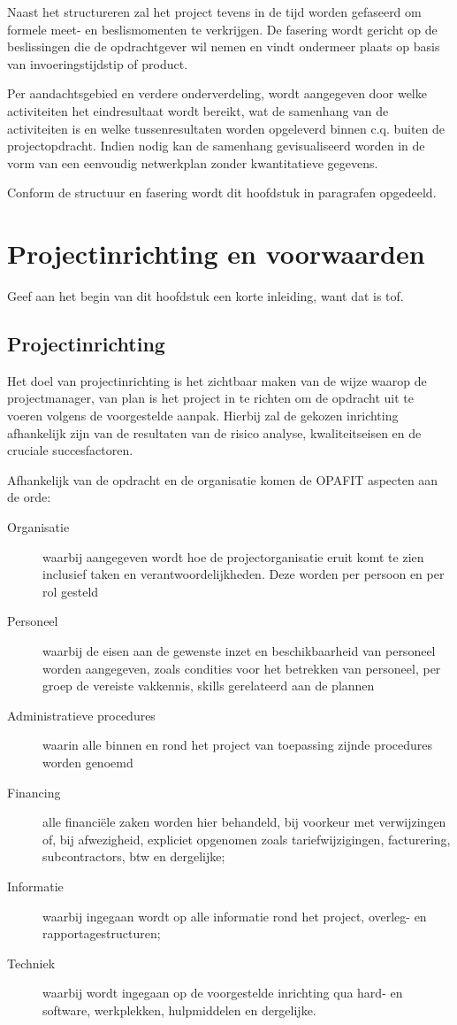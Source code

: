 \documentclass{article}
\begin{document}
Naast het structureren zal het project tevens in de tijd worden gefaseerd om formele meet- en beslismomenten te verkrijgen.
De fasering wordt gericht op de beslissingen die de opdrachtgever wil nemen
en vindt ondermeer plaats op basis van invoeringstijdstip of product.

Per aandachtsgebied en verdere onderverdeling, wordt aangegeven door welke activiteiten het eindresultaat wordt bereikt,
wat de samenhang van de activiteiten is en welke tussenresultaten worden opgeleverd binnen c.q. buiten de projectopdracht.
Indien nodig kan de samenhang gevisualiseerd worden in de vorm van een eenvoudig netwerkplan zonder kwantitatieve gegevens.

Conform de structuur en fasering wordt dit hoofdstuk in paragrafen opgedeeld.

\section{Projectinrichting en voorwaarden}

Geef aan het begin van dit hoofdstuk een korte inleiding, want dat is tof. %

\subsection{Projectinrichting}

Het doel van projectinrichting is het zichtbaar maken van de wijze waarop de projectmanager,
van plan is het project in te richten om de opdracht uit te voeren volgens de voorgestelde aanpak.
Hierbij zal de gekozen inrichting afhankelijk zijn van de resultaten van de risico analyse,
kwaliteitseisen en de cruciale succesfactoren.

Afhankelijk van de opdracht en de organisatie komen de OPAFIT aspecten aan de orde:
\begin{description}
  \item[Organisatie] waarbij aangegeven wordt hoe de projectorganisatie eruit komt te zien inclusief taken en verantwoordelijkheden.
  Deze worden per persoon en per rol gesteld
  \item[Personeel] waarbij de eisen aan de gewenste inzet en beschikbaarheid van personeel worden aangegeven,
  zoals condities voor het betrekken van personeel, per groep de vereiste vakkennis, skills gerelateerd aan de plannen
  \item[Administratieve procedures] waarin alle binnen en rond het project van toepassing zijnde procedures worden genoemd
  \item[Financing] alle financi\"ele zaken worden hier behandeld, bij voorkeur met verwijzingen of, bij afwezigheid,
  expliciet opgenomen zoals tariefwijzigingen, facturering, subcontractors, btw en dergelijke;
  \item[Informatie] waarbij ingegaan wordt op alle informatie rond het project, overleg- en rapportagestructuren;
  \item[Techniek] waarbij wordt ingegaan op de voorgestelde inrichting qua hard- en software, werkplekken, hulpmiddelen en dergelijke.
\end{description}
\end{document}
